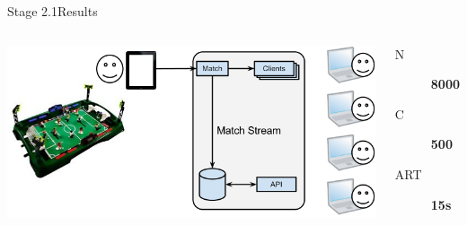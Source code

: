 \documentclass[utf8]{beamer}
\begin{document}
\begin{frame}{Stage 2.1}{Results}
	\begin{columns}
			\includegraphics[top=-1,width=\textwidth]{img/results-3-1.png}
			\begin{description}
				\item[N] \textbf{\Large 8000}
				\item[C] \textbf{\Large 500}
				\item[ART] \textbf{\Large 15s}
			\end{description}
	\end{columns}
\end{frame}
\end{document}
